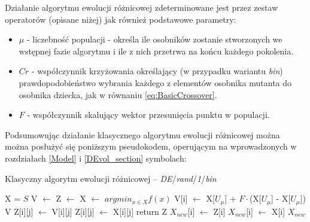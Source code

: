 \documentclass[12pt,a4paper]{report}
\begin{document}
{{\par{
Działanie algorytmu ewolucji różnicowej zdeterminowane jest przez zestaw operatorów (opisane niżej) jak również podstawowe parametry:
\begin{itemize}
\item $\mu$ - liczebność populacji - określa ile osobników zostanie stworzonych we wstępnej fazie algorytmu i ile z nich przetrwa na końcu każdego pokolenia.
\item $Cr$ - współczynnik krzyżowania określający (w przypadku wariantu \emph{bin}) prawdopodobieństwo wybrania każdego z elementów osobnika mutanta do osobnika dziecka, jak w równaniu \ref{eq:BasicCrossover}.
\item $F$ - współczynnik skalujący wektor przesunięcia punktu w populacji.
\end{itemize}
}

\par{
Podsumowując działanie klasycznego algorytmu ewolucji różnicowej można można posłużyć się poniższym pseudokodem, operującym na wprowadzonych w rozdziałach \ref{Model} i \ref{DEvol_section} symbolach:
\begin{algorithm}[H]
\caption{Klasyczny algorytm ewolucji różnicowej -- \emph{DE}/\emph{rand}/\emph{1}/\emph{bin}}
\label{algorithm:de}
\begin{algorithmic}[1]
    \State X = $S$
	    \State V $\gets$ 
        \State Z $\gets$ 
        \State X $\gets$ 
    \EndWhile
    \State \Return $argmin_{x \in X} f(x)$
\EndFunction
\State
{}
    	\State V[i] $\gets$ X[$U_\mu$] + $F \cdot $(X[$U_\mu$] - X[$U_\mu$])
    \EndFor
    \State \Return V
\EndFunction
\State
{}
                \State Z[i][j] $\gets$ V[i][j]
            \Else
                \State Z[i][j] $\gets$ X[i][j]
            \EndIf
        \EndFor
    \EndFor
    \State \Return return Z
\EndFunction
\State
{}
            \State $X_{new}$[i] $\gets$ Z[i]
        \Else
            \State $X_{new}$[i] $\gets$ X[i]
        \EndIf
    \EndFor
    \State \Return $X_{new}$
\EndFunction
\end{algorithmic}
\end{algorithm}

}}}
\end{document}
